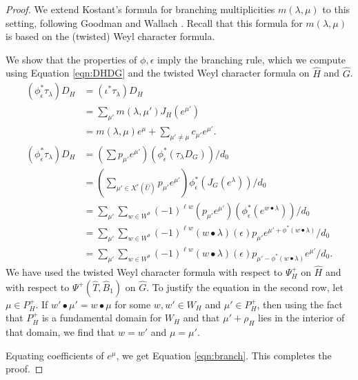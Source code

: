 \begin{proof}
  We extend Kostant's formula for branching multiplicities
  $m(\lambda,\mu)$ to this setting, following Goodman and Wallach
  \cite[\S8.2.2]{goodman}.  Recall that this formula for
  $m(\lambda,\mu)$ is based on the (twisted) Weyl character formula.

  We show that the properties of $\phi,\epsilon$ imply the branching
  rule, which we compute using Equation \ref{eqn:DHDG} and
  the twisted Weyl character formula on
  $\hat H$ and $\hat G$. 
\begin{align*}
(\phi^*_\epsilon\tau_\lambda) D_H 
 &= (\iota^*\tau_\lambda) D_H\\
 &= \sum_{\mu'} m(\lambda,{\mu'}) J_H(e^{\mu'})\\
  &= m(\lambda,\mu)e^\mu + \sum_{\mu'\ne\mu} c_{\mu'} e^{\mu'}.\\
(\phi^*_\epsilon\tau_\lambda) D_H 
  &= (\sum p_{\mu'} e^{\mu'})(\phi^*_\epsilon(\tau_\lambda D_{G})) /d_0\\
  &= (\sum_{\mu'\in X^*(\hat U)} p_{\mu'} e^{\mu'}) \phi^*_\epsilon(J_G(e^\lambda)) /d_0\\
  &= \sum_{\mu'} \sum_{w\in W^\theta} (-1)^{\ell w} 
  (p_{\mu'} e^{\mu'}) (\phi^*_\epsilon (e^{w\bullet \lambda})) /d_0\\
  &= \sum_{\mu'} \sum_{w\in W^\theta} (-1)^{\ell w}  
 ({w\bullet\lambda})(\epsilon) p_{\mu'}
e^{\mu'+\phi^*(w\bullet \lambda)} /d_0\\
  &= \sum_{\mu'} \sum_{w\in W^\theta} 
(-1)^{\ell w} ({w\bullet\lambda})(\epsilon) 
 p_{\mu' - \phi^*({w\bullet \lambda})} e^{\mu'} /d_0.
\end{align*}
We have used the twisted Weyl character formula with respect to $\Psi^+_H$ on $\hat H$
and with respect to $\Psi^+(\hat T,\hat B_1)$  on $\hat G$.
To justify the equation in the second row, let $\mu\in P_H^+$.  If
$w'\bullet \mu' = w\bullet \mu$ for some $w,w'\in W_H$ and $\mu'\in
P_H^+$, then using the fact that $P_H^+$ is a fundamental domain for
$W_H$ and that $\mu'+\rho_H$ lies in the interior of that domain, we
find that $w=w'$ and $\mu=\mu'$.

Equating coefficients of $e^\mu$, we get Equation \ref{eqn:branch}.
This completes the proof.
\end{proof}



